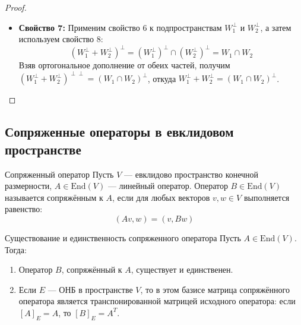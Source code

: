 \begin{proof}
\begin{itemize}
		\item \textbf{Свойство 7:} Применим свойство 6 к подпространствам $W_1^\perp$ и $W_2^\perp$, а затем используем свойство 8:
		\[
		(W_1^\perp + W_2^\perp)^\perp = (W_1^\perp)^\perp \cap (W_2^\perp)^\perp = W_1 \cap W_2
		\]
		Взяв ортогональное дополнение от обеих частей, получим $(W_1^\perp + W_2^\perp)^{\perp\perp} = (W_1 \cap W_2)^\perp$, откуда $W_1^\perp + W_2^\perp = (W_1 \cap W_2)^\perp$.
	\end{itemize}
\end{proof}

\subsection{Сопряженные операторы в евклидовом пространстве}

\begin{Definition}{Сопряженный оператор}{}
	Пусть $V$ — евклидово пространство конечной размерности, $A \in \mathrm{End}(V)$ — линейный оператор. Оператор $B \in \mathrm{End}(V)$ называется сопряжённым к $A$, если для любых векторов $v, w \in V$ выполняется равенство:
	\[
	(Av, w) = (v, Bw)
	\]
\end{Definition}

\begin{Proposition}{Существование и единственность сопряженного оператора}{}
	Пусть $A \in \mathrm{End}(V)$. Тогда:
	\begin{enumerate}
		\item Оператор $B$, сопряжённый к $A$, существует и единственен.
		\item Если $E$ — ОНБ в пространстве $V$, то в этом базисе матрица сопряжённого оператора является транспонированной матрицей исходного оператора: если $[A]_E = A$, то $[B]_E = A^T$.
	\end{enumerate}
\end{Proposition}

